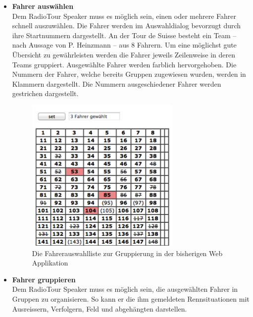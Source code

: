 \begin{itemize}
\item \textbf{Fahrer auswählen}\\
Dem RadioTour Speaker muss es möglich sein, einen oder mehrere Fahrer schnell auszuwählen. Die Fahrer werden im Auswahldialog bevorzugt durch ihre Startnummern dargestellt. An der Tour de Suisse besteht ein Team – nach Aussage von P. Heinzmann – aus 8 Fahrern. Um eine möglichst gute Übersicht zu gewährleisten werden die Fahrer jeweils Zeilenweise in deren Teams gruppiert. Ausgewählte Fahrer werden farblich hervorgehoben. Die Nummern der Fahrer, welche bereits Gruppen zugewiesen wurden, werden in Klammern dargestellt. Die Nummern ausgeschiedener Fahrer werden gestrichen dargestellt.

\begin{figure}[h!]
  \caption{Die Fahrerauswahlliste zur Gruppierung in der bisherigen Web Applikation}
  \begin{center}
    \includegraphics{05bericht/images/uc01_fahrerliste.png}
  \end{center}
\end{figure}

\item \textbf{Fahrer gruppieren}\\
Dem RadioTour Speaker muss es möglich sein, die ausgewählten Fahrer in Gruppen zu organisieren. So kann er die ihm gemeldeten Rennsituationen mit Ausreissern, Verfolgern, Feld und abgehängten darstellen.


\end{itemize}
